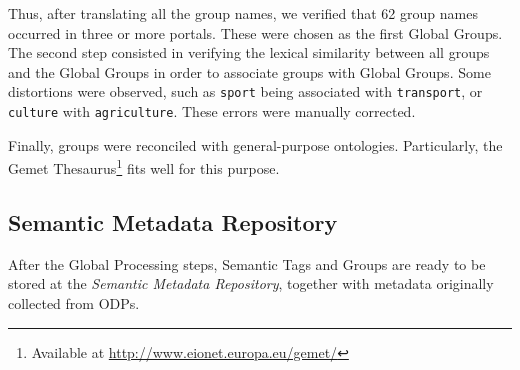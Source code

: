 Thus, after translating all the group names, we verified that 62 group names occurred in three or more portals.
These were chosen as the first Global Groups.
The second step consisted in verifying the lexical similarity between all groups and the Global Groups in order to associate groups with Global Groups.
Some distortions were observed, such as \texttt{sport} being associated with \texttt{transport}, or \texttt{culture} with \texttt{agriculture}.
These errors were manually corrected.

Finally, groups were reconciled with general-purpose ontologies.
Particularly, the Gemet Thesaurus\footnote{Available at \url{http://www.eionet.europa.eu/gemet/}} fits well for this purpose.


\subsection{Semantic Metadata Repository}
\label{sec:semantic_metadata_repo}

After the Global Processing steps, Semantic Tags and Groups are ready to be stored at the \emph{Semantic Metadata Repository}, together with metadata originally collected from ODPs.



